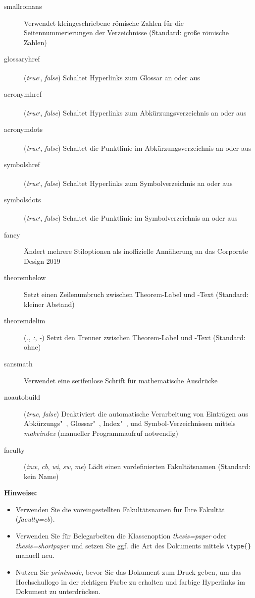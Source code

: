 \begin{description}
		\item[smallromans] Verwendet kleingeschriebene römische Zahlen für die Seitennummerierungen der Verzeichnisse (Standard: große römische Zahlen)
		\item[glossaryhref] (\textit{true}\textsuperscript{,}, \textit{false}) Schaltet Hyperlinks zum Glossar an oder aus
		\item[acronymhref] (\textit{true}\textsuperscript{,}, \textit{false}) Schaltet Hyperlinks zum Abkürzungsverzeichnis an oder aus
		\item[acronymdots] (\textit{true}\textsuperscript{,}, \textit{false}) Schaltet die Punktlinie im Abkürzungsverzeichnis an oder aus
		\item[symbolshref] (\textit{true}\textsuperscript{,}, \textit{false}) Schaltet Hyperlinks zum Symbolverzeichnis an oder aus
		\item[symbolsdots] (\textit{true}\textsuperscript{,}, \textit{false}) Schaltet die Punktlinie im Symbolverzeichnis an oder aus
		\item[fancy] Ändert mehrere Stiloptionen als inoffizielle Annäherung an das Corporate Design 2019
		\item[theorembelow] Setzt einen Zeilenumbruch zwischen Theorem-Label und -Text (Standard: kleiner Abstand)
		\item[theoremdelim] (\textit{.}, \textit{:}, \textit{-}) Setzt den Trenner zwischen Theorem-Label und -Text (Standard: ohne)
		\item[sansmath] Verwendet eine serifenlose Schrift für mathematische Ausdrücke
		\item[noautobuild] (\textit{true}, \textit{false}) Deaktiviert die automatische Verarbeitung von Einträgen aus Abkürzungs"~, Glossar"~, Index"~, und Symbol-Verzeichnissen mittels \textit{makeindex} (manueller Programmaufruf notwendig)
		\item[faculty] (\textit{inw}, \textit{cb}, \textit{wi}, \textit{sw}, \textit{me}) Lädt einen vordefinierten Fakultätsnamen (Standard: kein Name)
	\end{description}
	
	\textbf{Hinweise:}
	\begin{itemize}
		\item Verwenden Sie die voreingestellten Fakultätsnamen für Ihre Fakultät (\textit{faculty=cb}).
		\item Verwenden Sie für Belegarbeiten die Klassenoption \textit{thesis=paper} oder \textit{thesis=shortpaper} und setzen Sie ggf. die Art des Dokuments mittels \verb|\type{}| manuell neu.
		\item Nutzen Sie \textit{printmode}, bevor Sie das Dokument zum Druck geben, um das Hochschullogo in der richtigen Farbe zu erhalten und farbige Hyperlinks im Dokument zu unterdrücken.
	\end{itemize}
	
